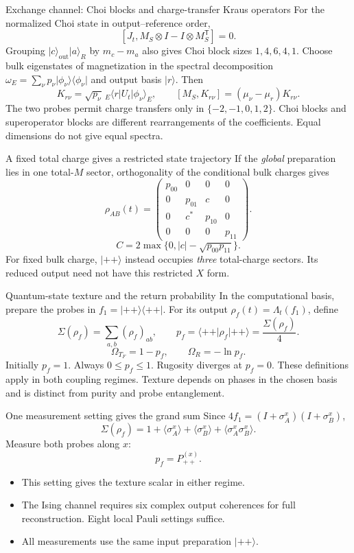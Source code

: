 \documentclass[aspectratio=169,11pt]{beamer}
\newcommand{\ket}[1]{\lvert #1\rangle}
\newcommand{\bra}[1]{\langle #1\rvert}
\begin{document}
\begin{frame}{Exchange channel: Choi blocks and charge-transfer Kraus operators}
\small
For the normalized Choi state in output--reference order,
\[
[J_t,M_S\otimes I-I\otimes M_S^{\mathsf T}]=0.
\]
Grouping $\ket c_{\mathrm{out}}\ket a_R$ by $m_c-m_a$ also gives
Choi block sizes $1,4,6,4,1$.
\medskip
Choose bulk eigenstates of magnetization in the spectral decomposition
$\omega_E=\sum_\nu p_\nu\ket{\phi_\nu}\bra{\phi_\nu}$ and output basis $\ket r$.
Then
\[
K_{r\nu}=\sqrt{p_\nu}\,{}_E\bra rU_t\ket{\phi_\nu}_E,\qquad
[M_S,K_{r\nu}]=(\mu_\nu-\mu_r)K_{r\nu}.
\]
The two probes permit charge transfers only in $\{-2,-1,0,1,2\}$.
\medskip
Choi blocks and superoperator blocks are different rearrangements of the
coefficients. Equal dimensions do not give equal spectra.
\end{frame}

\begin{frame}{A fixed total charge gives a restricted state trajectory}
If the \emph{global} preparation lies in one total-$M$ sector,
orthogonality of the conditional bulk charges gives
\[
\rho_{AB}(t)=\begin{pmatrix}
p_{00}&0&0&0\\
0&p_{01}&c&0\\
0&c^*&p_{10}&0\\
0&0&0&p_{11}
\end{pmatrix}.
\]
\[
C=2\max\{0,|c|-\sqrt{p_{00}p_{11}}\}.
\]
For fixed bulk charge, $\ket{++}$ instead occupies \emph{three} total-charge
sectors. Its reduced output need not have this restricted $X$ form.
\end{frame}

\begin{frame}{Quantum-state texture and the return probability}
In the computational basis, prepare the probes in $f_1=\ket{++}\bra{++}$.
For its output $\rho_f(t)=\Lambda_t(f_1)$, define
\[
\Sigma(\rho_f)=\sum_{a,b}(\rho_f)_{ab},\qquad
p_f=\bra{++}\rho_f\ket{++}=\frac{\Sigma(\rho_f)}4.
\]
\[
\boxed{\Omega_{T_F}=1-p_f,\qquad \Omega_R=-\ln p_f.}
\]
Initially $p_f=1$. Always $0\le p_f\le1$.
Rugosity diverges at $p_f=0$.
\medskip
These definitions apply in both coupling regimes.
Texture depends on phases in the chosen basis and is distinct from purity
and probe entanglement.
\end{frame}

\begin{frame}{One measurement setting gives the grand sum}
Since $4f_1=(I+\sigma_A^x)(I+\sigma_B^x)$,
\[
\boxed{\Sigma(\rho_f)=1+\langle\sigma_A^x\rangle
+\langle\sigma_B^x\rangle+\langle\sigma_A^x\sigma_B^x\rangle.}
\]
Measure both probes along $x$:
\[
p_f=P_{++}^{(x)}.
\]
\begin{itemize}\setlength\itemsep{9pt}
\item This setting gives the texture scalar in either regime.
\item The Ising channel requires six complex output coherences for full
reconstruction. Eight local Pauli settings suffice.
\item All measurements use the same input preparation $\ket{++}$.
\end{itemize}
\end{frame}
\end{document}
